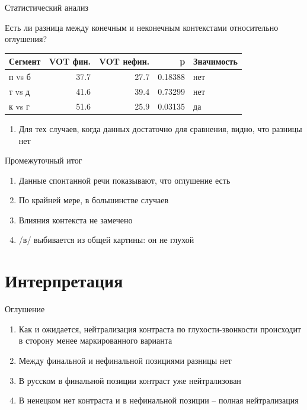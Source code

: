 \documentclass[10 pt, handout]{beamer}
\begin{document}
\begin{frame}{Статистический анализ}

	Есть ли разница между конечным и неконечным контекстами относительно оглушения?
	\vfill

\begin{tabular}{lrrrl}
\toprule
\textbf{Сегмент} &  \textbf{VOT фин.} &  \textbf{VOT нефин.} &       \textbf{p} & \textbf{Значимость} \\
\midrule
 п vs б &      37.7 &      27.7 & 0.18388 &          нет \\
 т vs д &      41.6 &      39.4 & 0.73299 &          нет \\
 к vs г &      51.6 &      25.9 & 0.03135 &         да \\
\bottomrule
\end{tabular}

	\vfill
	\begin{enumerate}[$\gg$]
		\item Для тех случаев, когда данных достаточно для сравнения, видно, что разницы нет
	\end{enumerate}

\end{frame}

\begin{frame}{Промежуточный итог}

	\begin{enumerate}[$\gg$]
		\item Данные спонтанной речи показывают, что оглушение есть
		\item По крайней мере, в большинстве случаев
		\item Влияния контекста не замечено
		\item /в/ выбивается из общей картины: он не глухой
	\end{enumerate}

\end{frame}

	\section{Интерпретация}

\begin{frame}{Оглушение}

	\begin{enumerate}[$\gg$]
		\item Как и ожидается, нейтрализация контраста по глухости-звонкости происходит в сторону менее маркированного варианта
		\item Между финальной и нефинальной позициями разницы нет
		\item В русском в финальной позиции контраст уже нейтрализован
		\item В ненецком нет контраста и в нефинальной позиции -- полная нейтрализация
	\end{enumerate}

\end{frame}
\end{document}
